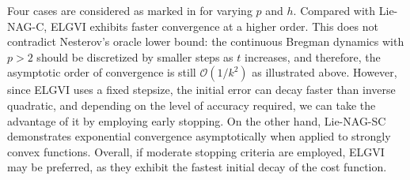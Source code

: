 \documentclass[letterpaper, 10pt, conference]{ieeeconf}
\begin{document}
Four cases are considered as marked in  for varying $p$ and $h$.
Compared with Lie-NAG-C, ELGVI exhibits faster convergence at a higher order. 
This does not contradict Nesterov's oracle lower bound: the continuous Bregman dynamics with $p>2$ should be discretized by smaller steps as $t$ increases, and therefore, the asymptotic order of convergence is still $\mathcal{O}(1/k^2)$ as illustrated above.
However, since ELGVI uses a fixed stepsize, the initial error can decay faster than inverse quadratic, and depending on the level of accuracy required, we can take the advantage of it by employing early stopping.
On the other hand, Lie-NAG-SC demonstrates exponential convergence asymptotically when applied to strongly convex functions. 
Overall, if  moderate stopping criteria are employed, ELGVI may be preferred, as they exhibit the fastest initial decay of the cost function.
\end{document}
